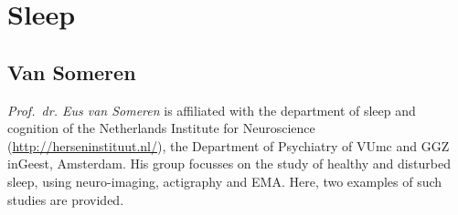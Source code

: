 \documentclass[]{book}
\begin{document}
\section{Sleep}\label{sleep}

\subsection{Van Someren}\label{van-someren}


\emph{Prof.~dr. Eus van Someren} is affiliated with the department of
sleep and cognition of the Netherlands Institute for Neuroscience
(\url{http://herseninstituut.nl/}), the Department of Psychiatry of VUmc
and GGZ inGeest, Amsterdam. His group focusses on the study of healthy
and disturbed sleep, using neuro-imaging, actigraphy and EMA. Here, two
examples of such studies are provided.
\end{document}
